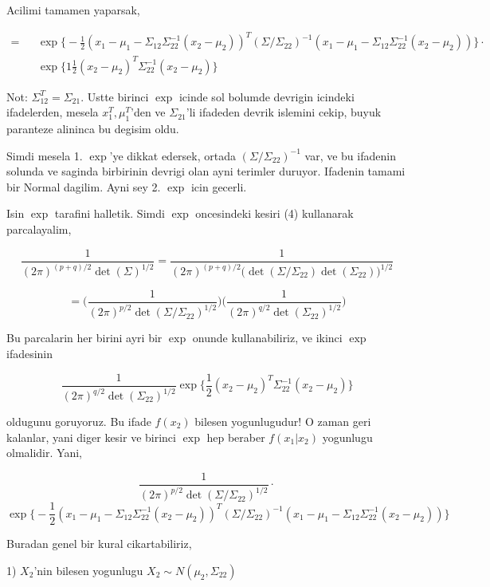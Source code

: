 \documentclass[12pt,fleqn]{article}\usepackage{../common}
\begin{document}
Acilimi tamamen yaparsak, 

\[ 
 \begin{array}{lll}
= && \exp \bigg\{
-\frac{1 }{2} 
(x_1 - \mu_1 - \Sigma_{12}\Sigma_{22}^{-1} (x_2 - \mu_2))^T 
(\Sigma/\Sigma_{22})^{-1} 
(x_1 - \mu_1 - \Sigma_{12}\Sigma_{22}^{-1} (x_2 - \mu_2))
\bigg\} \cdot \\
&& \exp \bigg\{
1\frac{ 1}{2}(x_2-\mu_2)^T\Sigma_{22}^{-1} (x_2-\mu_2)
 \bigg\}
\end{array}
 \]

Not: $\Sigma_{12}^T = \Sigma_{21}$. Ustte birinci $\exp$ icinde sol bolumde devrigin icindeki ifadelerden,  
mesela $x_1^T,\mu_1^T$'den ve $\Sigma_{21}$'li ifadeden devrik islemini cekip, buyuk paranteze 
alininca bu degisim oldu. 

Simdi mesela 1. $\exp$'ye dikkat edersek, ortada $(\Sigma/\Sigma_{22})^{-1} $ var, ve bu ifadenin solunda ve saginda 
birbirinin devrigi olan ayni terimler duruyor. Ifadenin tamami bir Normal
dagilim. Ayni sey 2. $\exp$ icin gecerli. 

Isin $\exp$ tarafini halletik. Simdi $\exp$ oncesindeki kesiri (4) kullanarak
parcalayalim, 

\[ 
\frac{ 1}{(2\pi)^{(p+q)/2} \det(\Sigma)^{1/2}}  = 
\frac{ 1}{(2\pi)^{(p+q)/2} \bigg(\det(\Sigma/\Sigma_{22})\det(\Sigma_{22})\bigg)^{1/2}} 
 \]

\[ =
\bigg( \frac{ 1}{(2\pi)^{p/2} \det(\Sigma/\Sigma_{22})^{1/2}} \bigg)
\bigg( \frac{ 1}{(2\pi)^{q/2} \det(\Sigma_{22})^{1/2}} \bigg)
 \]

Bu parcalarin her birini ayri bir $\exp$ onunde kullanabiliriz, ve ikinci $\exp$
ifadesinin 

\[ 
\frac{ 1}{(2\pi)^{q/2} \det(\Sigma_{22})^{1/2}}
\exp \bigg\{
\frac{ 1}{2}(x_2-\mu_2)^T\Sigma_{22}^{-1} (x_2-\mu_2)
 \bigg\}
 \]


oldugunu goruyoruz. Bu ifade $f(x_2)$ bilesen yogunlugudur! O zaman geri
kalanlar, yani diger kesir ve birinci $\exp$ hep beraber $f(x_1|x_2)$
yogunlugu olmalidir. Yani,

\[ 
\frac{ 1}{(2\pi)^{p/2} \det(\Sigma/\Sigma_{22})^{1/2}} \cdot
 \]
\[ 
\exp \bigg\{
-\frac{1 }{2} 
(x_1 - \mu_1 - \Sigma_{12}\Sigma_{22}^{-1} (x_2 - \mu_2))^T 
(\Sigma/\Sigma_{22})^{-1} 
(x_1 - \mu_1 - \Sigma_{12}\Sigma_{22}^{-1} (x_2 - \mu_2))
\bigg\}
 \]

Buradan genel bir kural cikartabiliriz, 

1) $X_2$'nin bilesen yogunlugu $X_2 \sim N(\mu_2, \Sigma_{22})$
\end{document}
